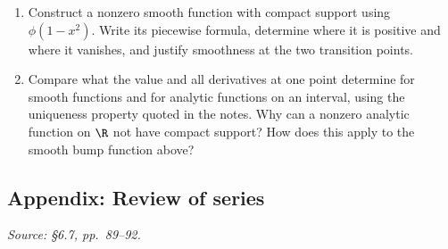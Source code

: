 \begin{enumerate}[resume]
  \item Construct a nonzero smooth function with compact support
    using \(\phi(1-x^2)\). Write its piecewise formula, determine
    where it is positive and where it vanishes, and justify smoothness
    at the two transition points.

  \item Compare what the value and all derivatives at one point
    determine for smooth functions and for analytic functions on
    an interval, using the uniqueness property quoted in the notes.
    Why can a nonzero analytic function on \(\R\) not have compact
    support? How does this apply to the smooth bump function above?
\end{enumerate}

\subsection{Appendix: Review of series}
\textit{Source: \S6.7, pp.~89--92.}

